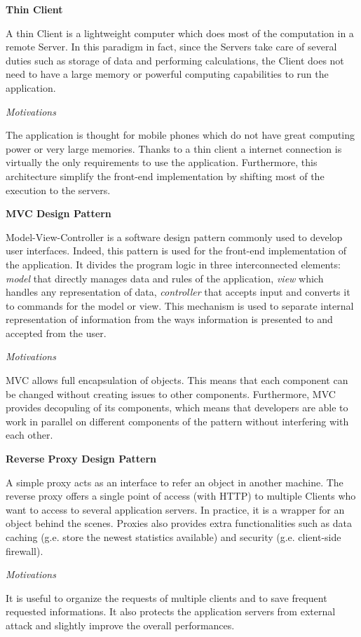 \documentclass{report}
\begin{document}
\begin{center}\large{\textbf{Thin Client}}\end{center}
A thin Client is a lightweight computer which does most of the computation in a remote Server. In this paradigm in fact, since the Servers take care of several duties such as storage 
of data and performing calculations, the Client does not need to have a large memory or powerful computing capabilities to run the application.
\begin{center}\large{\textit{Motivations}}\end{center} 
The application is thought for mobile phones which do not have great computing power or very large memories. Thanks to a thin client a internet connection is virtually the only requirements to use the application. Furthermore, this architecture simplify the front-end implementation by shifting most of the execution to the servers.

\begin{center}\large{\textbf{MVC Design Pattern}}\end{center}
Model-View-Controller is a software design pattern commonly used to develop user interfaces. Indeed, this pattern is used for the front-end implementation of the application. It divides the program logic in three interconnected elements: \textit{model} that directly manages data and rules of the application, \textit{view} which handles any representation of data, \textit{controller} that 
accepts input and converts it to commands for the model or view. This mechanism is used to separate internal representation of information from the ways information is presented to and accepted from the user. \\
\begin{center}\large{\textit{Motivations}}\end{center} 
MVC allows full encapsulation of objects. This means that each component can be changed without creating issues to other components.
Furthermore, MVC provides decopuling of its components, which means that developers are able to work in parallel on different components of the pattern without interfering with each other.

\begin{center}\large{\textbf{Reverse Proxy Design Pattern}}\end{center}
A simple proxy acts as an interface to refer an object in another machine. The reverse proxy offers a single point of access (with HTTP) to multiple Clients who want to access to several application servers. In practice, it is a wrapper for an object behind the scenes. 
Proxies also provides extra functionalities such as data caching (g.e. store the newest statistics available) and security (g.e. client-side firewall).\\
\begin{center}\large{\textit{Motivations}}\end{center} 
It is useful to organize the requests of multiple clients and to save frequent requested informations. It also protects the application servers from external attack and slightly improve the overall performances.
\end{document}
